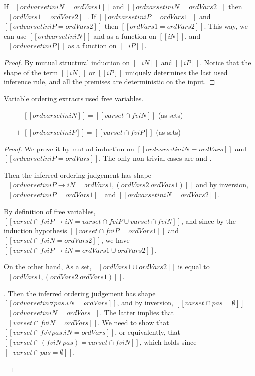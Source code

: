 \begin{observation}
  \label{obs:ord-deterministic}
  If $[[ord varset in iN = ordVars1]]$ and $[[ord varset in iN = ordVars2]]$ then $[[ordVars1 = ordVars2]]$.
  If $[[ord varset in iP = ordVars1]]$ and $[[ord varset in iP = ordVars2]]$ then $[[ordVars1 = ordVars2]]$.
  This way, we can use $[[ord varset in iN]]$ and as a function on $[[iN]]$,
  and $[[ord varset in iP]]$ as a function on $[[iP]]$.
\end{observation}
\begin{proof}
  By mutual structural induction on $[[iN]]$ and $[[iP]]$.
  Notice that the shape of the term $[[iN]]$ or $[[iP]]$
  uniquely determines the last used inference rule,
  and all the premises are deterministic on the input.
\end{proof}


\begin{lemma}
  \label{lemma:ord-soundness}
  Variable ordering extracts used free variables.
  \begin{itemize}
    \item[$-$] $[[ {ord varset in iN} ]] = [[varset ∩ fv iN]]$ (as sets)
    \item[$+$] $[[ {ord varset in iP} ]] = [[varset ∩ fv iP]]$ (as sets)
  \end{itemize}
\end{lemma}
\begin{proof}
  We prove it by mutual induction on 
  $[[ ord varset in iN = ordVars ]]$ and $[[ ord varset in iP = ordVars ]]$.
  The only non-trivial cases are 
   and 
  .  
  \begin{caseof}
    \item {}  
      Then the inferred ordering judgement has shape
      $[[ord varset in iP → iN = ordVars1, (ordVars2 \ {ordVars1})]]$
      and by inversion, 
      $[[ord varset in iP = ordVars1]]$   
      and 
      $[[ord varset in iN = ordVars2]]$.

      By definition of free variables, 
      $[[varset ∩ fv iP → iN = varset ∩ fv iP ∪ varset ∩ fv iN]]$,
      and since by the induction hypothesis 
      $[[varset ∩ fv iP = {ordVars1}]]$ and
      $[[varset ∩ fv iN = {ordVars2}]]$,
      we have
      $[[varset ∩ fv iP → iN = {ordVars1} ∪ {ordVars2}]]$.

      On the other hand, 
      As a set, $[[{ordVars1} ∪ {ordVars2}]]$
      is equal to $[[ordVars1, (ordVars2 \ {ordVars1})]]$. 
    \item  {}.
      Then  the inferred ordering judgement has shape
      $[[ord varset in ∀pas.iN = ordVars]]$,
      and by inversion, 
      $[[varset ∩ {pas} = ∅]]$    
      $[[ord varset in iN = ordVars]]$.
      The latter implies that $[[varset ∩ fv iN = {ordVars}]]$.
      We need to show that $[[varset ∩ fv ∀pas.iN = {ordVars}]]$,
      or equivalently, that
      $[[varset ∩ (fv iN \ {pas}) = varset ∩ fv iN ]]$,
      which holds since $[[varset ∩ {pas} = ∅]]$.
  \end{caseof}
\end{proof}


